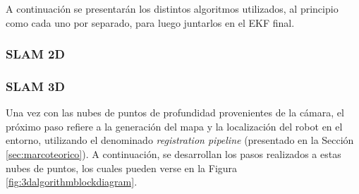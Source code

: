 A continuación se presentarán los distintos algoritmos utilizados, al principio como cada uno por separado, para luego juntarlos en el EKF final.

\subsubsection{SLAM 2D}

\subsubsection{SLAM 3D}
\fi
Una vez con las nubes de puntos de profundidad provenientes de la cámara, el próximo paso refiere a la generación del mapa y la localización del robot en el entorno, utilizando el denominado \textit{registration pipeline} (presentado en la Sección \ref{sec:marcoteorico}). A continuación, se desarrollan los pasos realizados a estas nubes de puntos, los cuales pueden verse en la Figura \ref{fig:3dalgorithmblockdiagram}.

